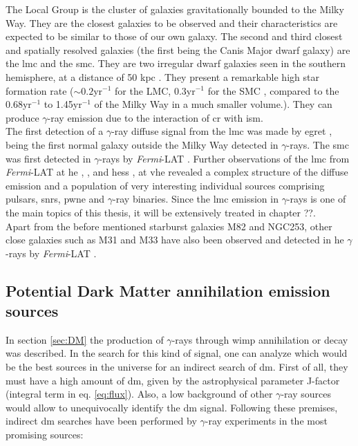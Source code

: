 \documentclass[main.tex]{subfiles}
\begin{document}
The Local Group is the cluster of galaxies gravitationally bounded to the Milky Way. They are the closest galaxies to be observed and their characteristics are expected to be similar to those of our own galaxy. The second and third closest and spatially resolved galaxies (the first being the Canis Major dwarf galaxy) are the \gls{lmc} and the \gls{smc}. They are two irregular dwarf galaxies seen in the southern hemisphere, at a distance of 50 kpc \cite{2018LMCdistance}. They present a remarkable high star formation rate ($\sim 0.2$yr$^{-1}$ for the LMC, $0.3$yr$^{-1}$ for the SMC \cite{2014LMCSFR}, compared to the 0.68yr$^{-1}$ to 1.45yr$^{-1}$ of the Milky Way \cite{2010MilkyWaySFR} in a much smaller volume.). They can produce $\gamma$-ray emission due to the interaction of \gls{cr} with \gls{ism}.\\
The first detection of a $\gamma$-ray diffuse signal from the \gls{lmc} was made by \gls{egret} \cite{1992LMCEgret}, being the first normal galaxy outside the Milky Way detected in $\gamma$-rays. The \gls{smc} was first detected in $\gamma$-rays by \textit{Fermi}-LAT \cite{2010SMCFermi}. Further observations of the \gls{lmc} from \textit{Fermi}-LAT at \gls{he} \cite{2010LMCFermifirst}, \cite{2016LMCFermi6years}, \cite{2016LMCFermiBinary} and \gls{hess} \cite{2015LMCHess}, \cite{2012LMCHessfirst} at \gls{vhe} revealed a complex structure of the diffuse emission and a population of very interesting individual sources comprising pulsars, \glspl{snr}, \gls{pwne} and $\gamma$-ray binaries. Since the \gls{lmc} emission in $\gamma$-rays is one of the main topics of this thesis, it will be extensively treated in chapter ??.\\
Apart from the before mentioned starburst galaxies M82 and NGC253, other close galaxies such as M31 and M33 have also been observed and detected in \gls{he} $\gamma$-rays by \textit{Fermi}-LAT \cite{2017M31M33Fermi}. 

\subsection{Potential Dark Matter annihilation emission sources}

In section \ref{sec:DM} the production of $\gamma$-rays through \gls{wimp} annihilation or decay was described. In the search for this kind of signal, one can analyze which would be the best sources in the universe for an indirect search of \gls{dm}. First of all, they must have a high amount of \gls{dm}, given by the astrophysical parameter J-factor (integral term in eq. \ref{eq:flux}). Also, a low background of other $\gamma$-ray sources would allow to unequivocally identify the \gls{dm} signal. Following these premises, indirect \gls{dm} searches have been performed by $\gamma$-ray experiments in the most promising sources:\\
\end{document}
